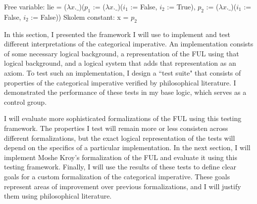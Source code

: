 \begin{isabellebody}
{  Free variable:
    lie = ($\lambda x. \_$)($p_1$ := ($\lambda x. \_$)($i_1$ := False, $i_2$ := True), $p_2$ := ($\lambda x. \_$)($i_1$ := False, $i_2$ := False))
  Skolem constant:
    x = $p_2$ \color{black}%
}%
\endisatagproof
{\isafoldproof}%
%
\isadelimproof
%
\endisadelimproof
%
\begin{isamarkuptext}%
In this section, I presented the framework I will use to implement and test different interpretations
of the categorical imperative. An implementation consists of some necessary logical background, a 
representation of the FUL using that logical background, and a logical system that adds that representation
as an axiom. To test such an implementation, I design a ``test suite" that consists of properties of 
the categorical imperative verified by philosophical literature. I demonstrated the performance of 
these tests in my base logic, which serves as a control group. 

I will evaluate more sophisticated formalizations of the FUL using this testing framework. The properties
I test will remain more or less consisten across different formalizations, but the exact logical representation
of the tests will depend on the specifics of a particular implementation. In the next section, I will 
implement Moshe Kroy's formalization of the FUL and evaluate it using this testing framework. Finally, 
I will use the results of these tests to define clear goals for a custom formalization of the categorical 
imperative. These goals represent areas of improvement over previous formalizations, and I will justify
them using philosophical literature.%
\end{isamarkuptext}\isamarkuptrue%
%
\isadelimtheory
%
\endisadelimtheory
%
\isatagtheory
%
\endisatagtheory
{\isafoldtheory}%
%
\isadelimtheory
%
\endisadelimtheory
%
\end{isabellebody}%
\endinput
